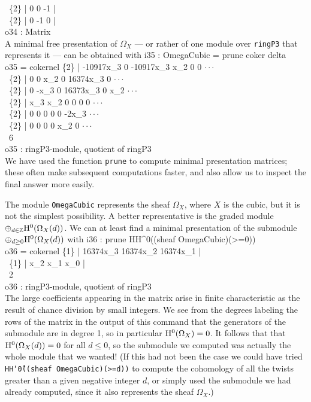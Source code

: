 \      \{2\} | 0  0  -1 |\\
\      \{2\} | 0  -1 0  |\\
\emptyLine
o34 : Matrix\\
\endOutput
A minimal free presentation of $\Omega_X$ --- or rather of
one module over
{\tt ringP3} that represents it --- can be obtained with
\beginOutput
i35 : OmegaCubic = prune coker delta\\
\emptyLine
o35 = cokernel \{2\} | -10917x_3 0    -10917x_3 x_2      0        0      $\cdot\cdot\cdot$\\
\               \{2\} | 0         0    x_2       0        16374x_3 0      $\cdot\cdot\cdot$\\
\               \{2\} | 0         -x_3 0         16373x_3 0        x_2    $\cdot\cdot\cdot$\\
\               \{2\} | x_3       x_2  0         0        0        0      $\cdot\cdot\cdot$\\
\               \{2\} | 0         0    0         0        0        -2x_3  $\cdot\cdot\cdot$\\
\               \{2\} | 0         0    0         0        x_2      0      $\cdot\cdot\cdot$\\
\emptyLine
\                                       6\\
o35 : ringP3-module, quotient of ringP3\\
\endOutput
We have used the function {\tt prune} to compute
minimal presentation matrices; these often make subsequent
computations faster, and also allow us to inspect the final 
answer more easily. 

The module {\tt OmegaCubic} represents the sheaf $\Omega_{X}$, where
$X$ is the cubic, but it is not the simplest possibility.
A better representative is the graded module
$\oplus_{d\in {\mathbb Z}} {\rm H}^0(\Omega_X(d))$. We can at least find 
a minimal presentation of the
submodule $\oplus_{d\geq 0} {\rm H}^0(\Omega_X(d))$ with
\beginOutput
i36 : prune HH^0((sheaf OmegaCubic)(>=0))\\
\emptyLine
o36 = cokernel \{1\} | 16374x_3 16374x_2 16374x_1 |\\
\               \{1\} | x_2      x_1      x_0      |\\
\emptyLine
\                                       2\\
o36 : ringP3-module, quotient of ringP3\\
\endOutput
The large coefficients appearing in the matrix arise in finite characteristic as the result
of chance division by small integers.
We see from the degrees labeling the rows of the matrix in the
output of this command that
the generators of the submodule are in degree 1,
so in particular ${\rm H}^0(\Omega_X) = 0$.
It follows that that
${\rm H}^0(\Omega_X(d)) = 0$ for all $d\leq 0$, so
the submodule we computed was actually the whole module
that we wanted! (If this had not been the case we could have tried
{\tt HH\char`\^0((sheaf OmegaCubic)(>=d))} to compute the cohomology
of all the twists greater than a given negative integer $d$,
or simply used the submodule we had already computed, since
it also represents the sheaf $\Omega_X$.)


